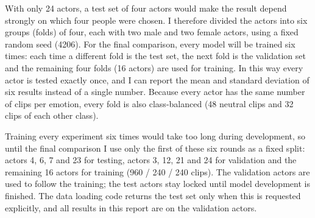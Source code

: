 With only 24 actors, a test set of four actors would make the result depend strongly on which four people were chosen. I therefore divided the actors into six groups (folds) of four, each with two male and two female actors, using a fixed random seed (4206). For the final comparison, every model will be trained six times: each time a different fold is the test set, the next fold is the validation set and the remaining four folds (16 actors) are used for training. In this way every actor is tested exactly once, and I can report the mean and standard deviation of six results instead of a single number. Because every actor has the same number of clips per emotion, every fold is also class-balanced (48 neutral clips and 32 clips of each other class).

Training every experiment six times would take too long during development, so until the final comparison I use only the first of these six rounds as a fixed split: actors 4, 6, 7 and 23 for testing, actors 3, 12, 21 and 24 for validation and the remaining 16 actors for training (960 / 240 / 240 clips). The validation actors are used to follow the training; the test actors stay locked until model development is finished. The data loading code returns the test set only when this is requested explicitly, and all results in this report are on the validation actors.
